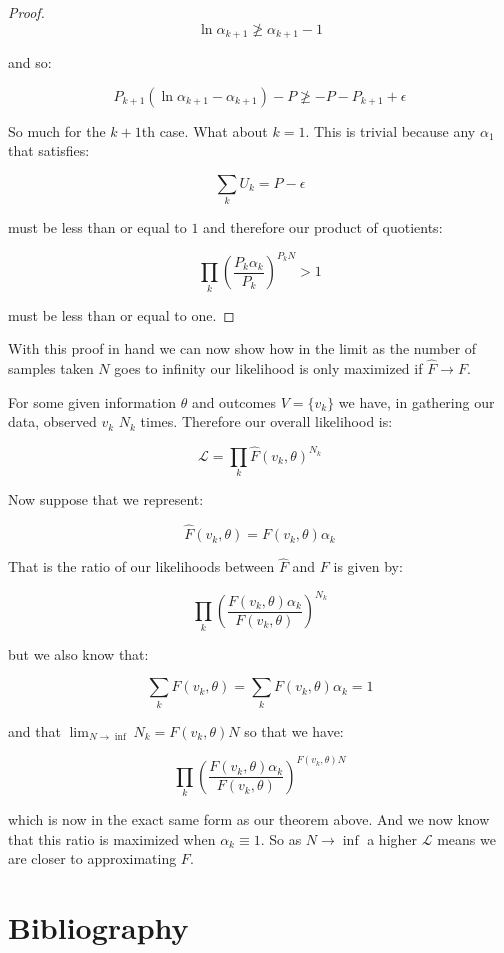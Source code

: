 \documentclass[11pt]{article}
\begin{document}
\begin{proof}
$$\ln \alpha_{k+1} \not\ge \alpha_{k+1}-1$$

and so:

$$P_{k+1}\left(\ln \alpha_{k+1} - \alpha_{k+1}\right) - P \not\ge -P - P_{k+1} + \epsilon$$

So much for the $k+1$th case. What about $k=1$. This is trivial because any $\alpha_1$ that satisfies:

$$\sum_k U_k = P-\epsilon$$

must be less than or equal to $1$ and therefore our product of quotients:

$$\prod_k \left(\frac{P_k\alpha_k}{P_k}\right)^{P_kN}>1$$

must be less than or equal to one. 

\end{proof}


With this proof in hand we can now show how in the limit as the number of samples taken $N$ goes to infinity our likelihood is only maximized if $\hat{F} \rightarrow F$. \newline

For some given information $\theta$ and outcomes $V=\lbrace v_k \rbrace$ we have, in gathering our data, observed $v_k$ $N_k$ times. Therefore our overall likelihood is:

$$\mathcal{L} = \prod_k \hat{F}(v_k, \theta)^{N_k}$$

Now suppose that we represent:

$$\hat{F}(v_k, \theta)=F(v_k, \theta)\alpha_k$$

That is the ratio of our likelihoods between $\hat{F}$ and $F$ is given by:

$$\prod_k \left(\frac{F(v_k, \theta)\alpha_k}{F(v_k, \theta)}\right)^{N_k}$$

but we also know that:

$$\sum_k F(v_k, \theta) = \sum_k F(v_k, \theta)\alpha_k = 1$$

and that $\lim_{N\rightarrow \inf}N_k = F(v_k, \theta)N$ so that we have:

$$\prod_k \left(\frac{F(v_k, \theta)\alpha_k}{F(v_k, \theta)}\right)^{F(v_k, \theta)N}$$

which is now in the exact same form as our theorem above. And we now know that this ratio is maximized when $\alpha_k\equiv 1$. So as $N\rightarrow \inf$ a higher $\mathcal{L}$ means we are closer to approximating $F$. 

\newpage















\section{Bibliography}



\end{document}
